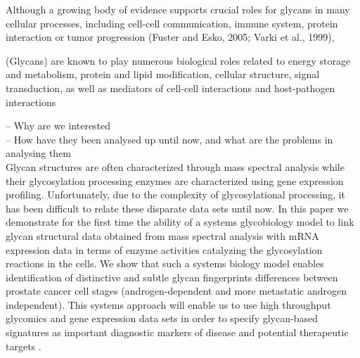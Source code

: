 \documentclass[12pt,a4paper]{article}
\begin{document}
Although a growing body of evidence supports crucial roles for glycans in many cellular processes, including cell-cell communication, immune system, protein interaction or tumor progression (Fuster and Esko, 2005; Varki et al., 1999), \citep{doi:10.1093/bioinformatics/btm090}

(Glycans) are known to play numerous biological roles related to energy storage and metabolism, protein and lipid modification, cellular structure, signal transduction, as well as mediators of cell-cell interactions and host-pathogen interactions \citep{SONG2012137}


-- Why are we interested\\

-- How have they been analysed up until now, and what are the problems in analysing them\\

Glycan structures are often characterized through mass spectral analysis while their glycosylation processing enzymes are characterized using gene expression profiling. Unfortunately, due to the complexity of glycosylational processing, it has been difficult to relate these disparate data sets until now. In this paper we demonstrate for the first time the ability of a systems glycobiology model to link glycan structural data obtained from mass spectral analysis with mRNA expression data in terms of enzyme activities catalyzing the glycosylation reactions in the cells. We show that such a systems biology model enables identification of distinctive and subtle glycan fingerprints differences between prostate cancer cell stages (androgen-dependent and more metastatic androgen independent). This systems approach will enable us to use high throughput glycomics and gene expression data sets in order to specify glycan-based signatures as important diagnostic markers of disease and potential therapeutic targets \citep{10.1371/journal.pcbi.1002813}.\\
\end{document}
